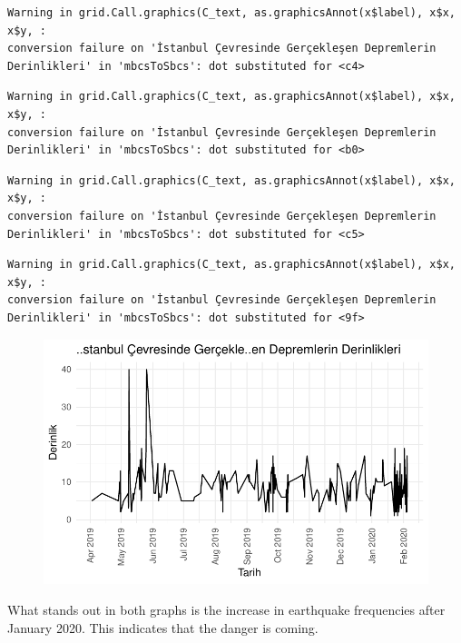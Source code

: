 \documentclass[
  11pt,
  a4paper,
  DIV=11,
  numbers=noendperiod]{scrartcl}
\begin{document}
\begin{verbatim}
Warning in grid.Call.graphics(C_text, as.graphicsAnnot(x$label), x$x, x$y, :
conversion failure on 'İstanbul Çevresinde Gerçekleşen Depremlerin
Derinlikleri' in 'mbcsToSbcs': dot substituted for <c4>
\end{verbatim}

\begin{verbatim}
Warning in grid.Call.graphics(C_text, as.graphicsAnnot(x$label), x$x, x$y, :
conversion failure on 'İstanbul Çevresinde Gerçekleşen Depremlerin
Derinlikleri' in 'mbcsToSbcs': dot substituted for <b0>
\end{verbatim}

\begin{verbatim}
Warning in grid.Call.graphics(C_text, as.graphicsAnnot(x$label), x$x, x$y, :
conversion failure on 'İstanbul Çevresinde Gerçekleşen Depremlerin
Derinlikleri' in 'mbcsToSbcs': dot substituted for <c5>
\end{verbatim}

\begin{verbatim}
Warning in grid.Call.graphics(C_text, as.graphicsAnnot(x$label), x$x, x$y, :
conversion failure on 'İstanbul Çevresinde Gerçekleşen Depremlerin
Derinlikleri' in 'mbcsToSbcs': dot substituted for <9f>
\end{verbatim}

\begin{figure}[H]

{\centering \includegraphics{project_files/figure-pdf/unnamed-chunk-17-2.pdf}

}

\end{figure}

What stands out in both graphs is the increase in earthquake frequencies
after January 2020. This indicates that the danger is coming.
\end{document}
